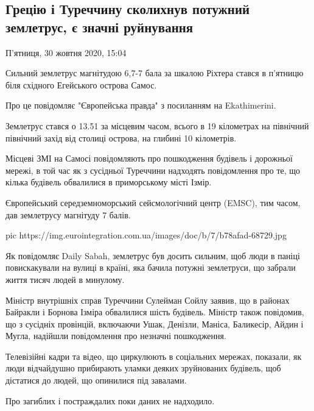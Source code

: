  
 
 

\subsection{Грецію і Туреччину сколихнув потужний землетрус, є значні руйнування}
\label{sec:30_10_2020.fb.news.ua.pravda.1.grecia_turcia_zemletrus}

П'ятниця, 30 жовтня 2020, 15:04

Сильний землетрус магнітудою 6,7-7 бала за шкалою Ріхтера стався в п'ятницю
біля східного Егейського острова Самос.

Про це повідомляє "Європейська правда" з посиланням на Ekathimerini.

Землетрус стався о 13.51 за місцевим часом, всього в 19 кілометрах на північний
північний захід від столиці острова, на глибині 10 кілометрів.

Місцеві ЗМІ на Самосі повідомляють про пошкодження будівель і дорожньої мережі,
в той час як з сусідньої Туреччини надходять повідомлення про те, що кілька
будівель обвалилися в приморському місті Ізмір.

Європейський середземноморський сейсмологічний центр (EMSC), тим часом, дав
землетрусу магнітуду 7 балів.

\ifcmt
pic https://img.eurointegration.com.ua/images/doc/b/7/b78afad-68729.jpg
\fi

Як повідомляє Daily Sabah, землетрус був досить сильним, щоб люди в паніці
повискакували на вулиці в країні, яка бачила потужні землетруси, що забрали
життя тисяч людей в минулому.

Міністр внутрішніх справ Туреччини Сулейман Сойлу заявив, що в районах Байракли
і Борнова Ізміра обвалилися шість будівель. Міністр також повідомив, що з
сусідніх провінцій, включаючи Ушак, Денізли, Маніса, Баликесір, Айдин і Мугла,
надійшли повідомлення про незначні пошкодження.

Телевізійні кадри та відео, що циркулюють в соціальних мережах, показали, як
люди відчайдушно прибирають уламки деяких зруйнованих будівель, щоб дістатися
до людей, що опинилися під завалами.

Про загиблих і постраждалих поки даних не надходило.

